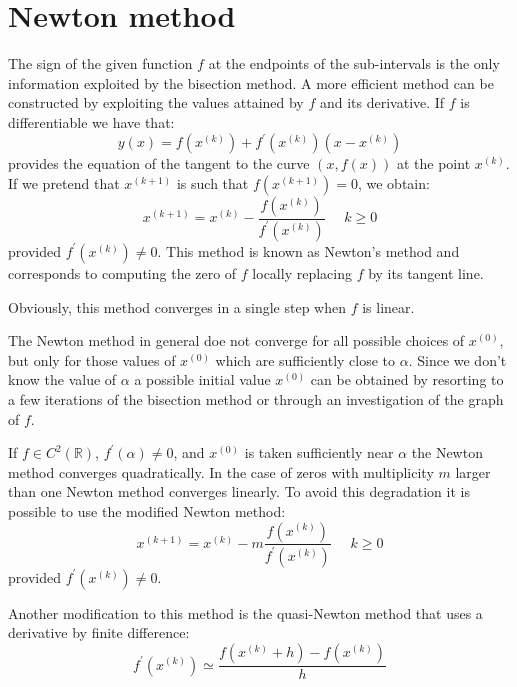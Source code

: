 \documentclass[12pt, a4paper]{report}
\newtheorem[style=M,bodystyle=\normalfont]{theorem}{Theorem}
\newtheorem[style=M,bodystyle=\normalfont]{proposition}{Proposition}
\newtheorem[style=M,bodystyle=\normalfont]{corollary}{Corollary}
\newtheorem[style=M,bodystyle=\normalfont]{lemma}{Lemma}
\newtheorem[style=M,bodystyle=\normalfont]{definition}{Definition}
\begin{document}
    \section{Newton method}
    The sign of the given function $f$ at the endpoints of the sub-intervals is the only information exploited by the bisection method. A more efficient method can be constructed 
    by exploiting the values attained by $f$ and its derivative. If $f$ is differentiable we have that: 
    \[y(x)=f(x^{(k)})+f^{'}(x^{(k)})(x-x^{(k)})\]
    provides the equation of the tangent to the curve $(x,f(x))$ at the point $x^{(k)}$. If we pretend that $x^{(k+1)}$ is such that $f(x^{(k+1)})=0$, we obtain:
    \[x^{(k+1)}=x^{(k)}-\dfrac{f(x^{(k)})}{f^{'}(x^{(k)})} \:\:\:\:\:\: k \geq 0\]
    provided $f^{'}(x^{(k)}) \neq 0$. This method is known as Newton's method and corresponds to computing the zero of $f$ locally replacing $f$ by its tangent line. 

    Obviously, this method converges in a single step when $f$ is linear. 

    The Newton method in general doe not converge for all possible choices of $x^{(0)}$, but only for those values of $x^{(0)}$ which are sufficiently close to $\alpha$. Since we 
    don't know the value of $\alpha$ a possible initial value $x^{(0)}$ can be obtained by resorting to a few iterations of the bisection method or through an investigation of the 
    graph of $f$. 

    If $f \in C^2(\mathbb{R})$, $f^{'}(\alpha) \neq 0$, and $x^{(0)}$ is taken sufficiently near $\alpha$ the Newton method converges quadratically. In the case of zeros with 
    multiplicity $m$ larger than one Newton method converges linearly. To avoid this degradation it is possible to use the modified Newton method:
    \[x^{(k+1)}=x^{(k)}-m\dfrac{f(x^{(k)})}{f^{'}(x^{(k)})} \:\:\:\:\:\: k \geq 0\]
    provided $f^{'}(x^{(k)}) \neq 0$.

    Another modification to this method is the quasi-Newton method that uses a derivative by finite difference: 
    \[f^{'}(x^{(k)}) \simeq \dfrac{f(x^{(k)}+h)-f(x^{(k)})}{h}\]
\end{document}
